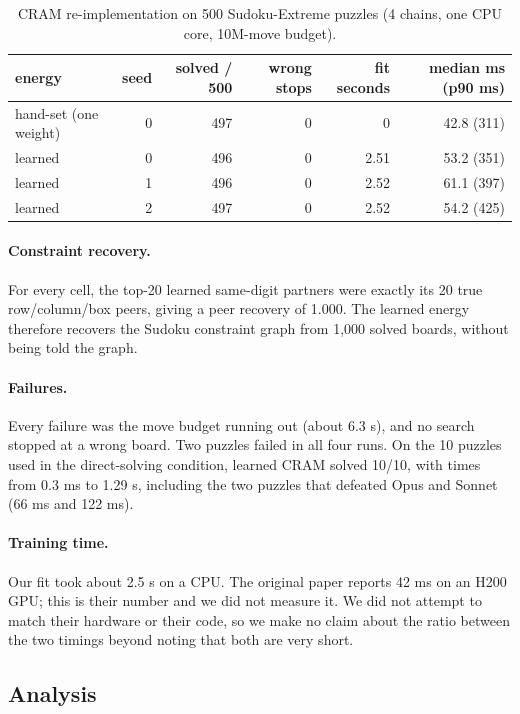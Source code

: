 \documentclass{article} %
\begin{document}
\begin{table}[t]
\centering
\caption{CRAM re-implementation on 500 Sudoku-Extreme puzzles (4 chains, one CPU core, 10M-move budget).}
\label{tab:cram}
\begin{tabular}{lrrrrr}
\toprule
energy & seed & solved / 500 & wrong stops & fit seconds & median ms (p90 ms) \\
\midrule
hand-set (one weight) & 0 & 497 & 0 & 0 & 42.8 (311) \\
learned & 0 & 496 & 0 & 2.51 & 53.2 (351) \\
learned & 1 & 496 & 0 & 2.52 & 61.1 (397) \\
learned & 2 & 497 & 0 & 2.52 & 54.2 (425) \\
\bottomrule
\end{tabular}
\end{table}

\paragraph{Constraint recovery.} For every cell, the top-20 learned same-digit partners were exactly its 20 true row/column/box peers, giving a peer recovery of 1.000. The learned energy therefore recovers the Sudoku constraint graph from 1,000 solved boards, without being told the graph.

\paragraph{Failures.} Every failure was the move budget running out (about 6.3 s), and no search stopped at a wrong board. Two puzzles failed in all four runs. On the 10 puzzles used in the direct-solving condition, learned CRAM solved 10/10, with times from 0.3 ms to 1.29 s, including the two puzzles that defeated Opus and Sonnet (66 ms and 122 ms).

\paragraph{Training time.} Our fit took about 2.5 s on a CPU. The original paper reports 42 ms on an H200 GPU; this is their number and we did not measure it. We did not attempt to match their hardware or their code, so we make no claim about the ratio between the two timings beyond noting that both are very short.

\subsection{Analysis}
\end{document}
